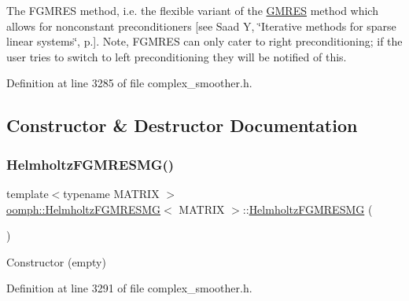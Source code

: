 The F\+G\+M\+R\+ES method, i.\+e. the flexible variant of the \hyperlink{classoomph_1_1GMRES}{G\+M\+R\+ES} method which allows for nonconstant preconditioners \mbox{[}see Saad Y, \char`\"{}\+Iterative methods for sparse linear systems\char`\"{}, p.\mbox{]}. Note, F\+G\+M\+R\+ES can only cater to right preconditioning; if the user tries to switch to left preconditioning they will be notified of this. 

Definition at line 3285 of file complex\+\_\+smoother.\+h.



\subsection{Constructor \& Destructor Documentation}
\mbox{\label{classoomph_1_1HelmholtzFGMRESMG_abadd59fadd8ddf7804cb6696f567dbe9}} 
\subsubsection{\texorpdfstring{Helmholtz\+F\+G\+M\+R\+E\+S\+M\+G()}{HelmholtzFGMRESMG()}\hspace{0.1cm}{\footnotesize\ttfamily [1/2]}}
{\footnotesize\ttfamily template$<$typename M\+A\+T\+R\+IX $>$ \\
\hyperlink{classoomph_1_1HelmholtzFGMRESMG}{oomph\+::\+Helmholtz\+F\+G\+M\+R\+E\+S\+MG}$<$ M\+A\+T\+R\+IX $>$\+::\hyperlink{classoomph_1_1HelmholtzFGMRESMG}{Helmholtz\+F\+G\+M\+R\+E\+S\+MG} (\begin{DoxyParamCaption}{ }\end{DoxyParamCaption})\hspace{0.3cm}{\ttfamily [inline]}}



Constructor (empty) 



Definition at line 3291 of file complex\+\_\+smoother.\+h.

\mbox{\label{classoomph_1_1HelmholtzFGMRESMG_a89c8378219342c65d10f2c0af160bebf}} 
